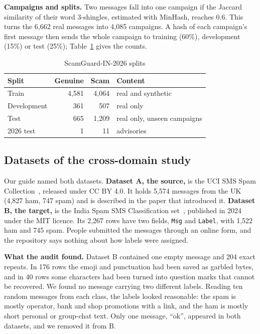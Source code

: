 \textbf{Campaigns and splits.} Two messages fall into one campaign if the Jaccard similarity of their word 3-shingles, estimated with MinHash, reaches 0.6. This turns the 6,662 real messages into 4,085 campaigns. A hash of each campaign's first message then sends the whole campaign to training (60\%), development (15\%) or test (25\%); Table~\ref{tab:splits} gives the counts.

\begin{table}[H]
\centering
\caption{ScamGuard-IN-2026 splits}
\label{tab:splits}
\begin{tabular}{|l|r|r|l|}
\hline
\textbf{Split} & \textbf{Genuine} & \textbf{Scam} & \textbf{Content} \\
\hline
Train & 4,581 & 4,064 & real and synthetic \\
\hline
Development & 361 & 507 & real only \\
\hline
Test & 665 & 1,209 & real only, unseen campaigns \\
\hline
2026 test & 1 & 11 & advisories \\
\hline
\end{tabular}
\end{table}

\subsection{Datasets of the cross-domain study}
Our guide named both datasets. \textbf{Dataset A, the source,} is the UCI SMS Spam Collection~\cite{almeida2011contributions}, released under CC BY 4.0. It holds 5,574 messages from the UK (4,827 ham, 747 spam) and is described in the paper that introduced it. \textbf{Dataset B, the target,} is the India Spam SMS Classification set~\cite{indiasms2024}, published in 2024 under the MIT licence. Its 2,267 rows have two fields, \texttt{Msg} and \texttt{Label}, with 1,522 ham and 745 spam. People submitted the messages through an online form, and the repository says nothing about how labels were assigned.

\textbf{What the audit found.} Dataset B contained one empty message and 204 exact repeats. In 176 rows the emoji and punctuation had been saved as garbled bytes, and in 40 rows some characters had been turned into question marks that cannot be recovered. We found no message carrying two different labels. Reading ten random messages from each class, the labels looked reasonable: the spam is mostly operator, bank and shop promotions with a link, and the ham is mostly short personal or group-chat text. Only one message, ``ok'', appeared in both datasets, and we removed it from B.


